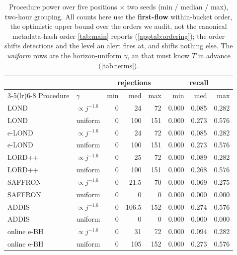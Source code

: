 \begin{table}[t]
\centering
\caption{Procedure power over five positions $\times$ two seeds (min / median / max),
two-hour grouping. All counts here use the \textbf{first-flow} within-bucket order, the optimistic upper bound over the orders we audit, not the canonical metadata-hash order \cref{tab:main} reports (\cref{apptab:ordering}); the order shifts detections and the level an alert fires at, and shifts nothing else. The \emph{uniform} rows are the horizon-uniform $\gamma$, an \oracle{} that must know $T$ in advance (\cref{tab:terms}).}
\label{apptab:procmatrix}
\begin{tabular}{llrrrrrr}
\toprule
 & & \multicolumn{3}{c}{rejections} & \multicolumn{3}{c}{recall} \\
\cmidrule(lr){3-5}\cmidrule(lr){6-8}
Procedure & $\gamma$ & min & med & max & min & med & max \\
\midrule
LOND & $\propto j^{-1.6}$ & 0 & 24 & 72 & 0.000 & 0.085 & 0.282 \\
LOND & uniform & 0 & 100 & 151 & 0.000 & 0.273 & 0.576 \\
e-LOND & $\propto j^{-1.6}$ & 0 & 24 & 72 & 0.000 & 0.085 & 0.282 \\
e-LOND & uniform & 0 & 100 & 151 & 0.000 & 0.273 & 0.576 \\
LORD++ & $\propto j^{-1.6}$ & 0 & 25 & 72 & 0.000 & 0.089 & 0.282 \\
LORD++ & uniform & 0 & 100 & 151 & 0.000 & 0.268 & 0.576 \\
SAFFRON & $\propto j^{-1.6}$ & 0 & 21.5 & 70 & 0.000 & 0.069 & 0.275 \\
SAFFRON & uniform & 0 & 0 & 0 & 0.000 & 0.000 & 0.000 \\
ADDIS & $\propto j^{-1.6}$ & 0 & 106.5 & 152 & 0.000 & 0.274 & 0.576 \\
ADDIS & uniform & 0 & 0 & 0 & 0.000 & 0.000 & 0.000 \\
online e-BH & $\propto j^{-1.6}$ & 0 & 31 & 72 & 0.000 & 0.094 & 0.282 \\
online e-BH & uniform & 0 & 105 & 152 & 0.000 & 0.273 & 0.576 \\
\bottomrule
\end{tabular}
\end{table}
